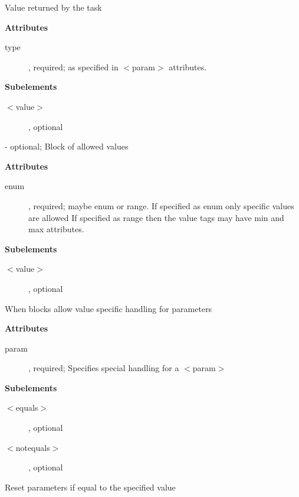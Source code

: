 \begin{description}
Value returned by the task
\begin{description}
\item \textbf{Attributes}
\begin{description}
\item [type], required; as specified in $<$param$>$ attributes.
\end{description}
\item \textbf{Subelements}
\begin{description}
\item [$<$value$>$], optional
\end{description}
\end{description}
\item [$<$allowed$>$] - optional;
Block of allowed values
\begin{description}
\item \textbf{Attributes}
\begin{description}
\item [enum], required; maybe enum or range. If specified as enum only specific values are allowed
If specified as range then the value tags may have min and max attributes.
\end{description}
\item \textbf{Subelements}
\begin{description}
\item [$<$value$>$], optional
\end{description}
\end{description}
\item [$<$when$>$ - optional]
When blocks allow value specific handling for parameters
\begin{description}
\item \textbf{Attributes}
\begin{description}
\item [param], required; Specifies special handling for a $<$param$>$
\end{description}
\item \textbf{Subelements}
\begin{description}
\item [$<$equals$>$], optional
\item [$<$notequals$>$], optional
\end{description}
\end{description}
\item [$<$equals$>$ - optional]
Reset parameters if equal to the specified value
\begin{description}

\end{description}
\end{description}
